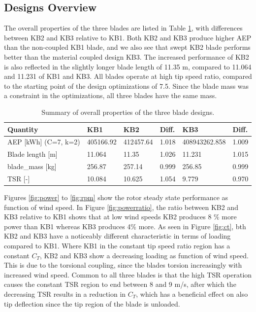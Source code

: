 \subsection{Designs Overview}

The overall properties of the three blades are listed in Table \ref{tab:overall_summary}, with differences between KB2 and KB3 relative to KB1.
Both KB2 and KB3 produce higher AEP than the non-coupled KB1 blade, and we also see that swept KB2 blade performs better than the material coupled design KB3.
The increased performance of KB2 is also reflected in the slightly longer blade length of 11.35 m, compared to 11.064 and 11.231 of KB1 and KB3.
All blades operate at high tip speed ratio, compared to the starting point of the design optimizations of 7.5.
Since the blade mass was a constraint in the optimizations, all three blades have the same mass.

\begin{table}
\begin{tabular}{l|l|ll|ll}
\hline
 Quantity     & KB1           & KB2           & Diff.          & KB3           & Diff.          \\
\hline
 AEP [kWh] (C=7, k=2)     & 405166.92 & 412457.64  & 1.018  & 408943262.858 & 1.009  \\
 Blade length [m] & 11.064 & 11.35  & 1.026  & 11.231  & 1.015  \\
 blade\_mass [kg]  & 256.87 & 257.14 & 0.999 & 256.85  & 0.999 \\
 TSR [-]          & 10.084 & 10.625  & 1.054   & 9.779 & 0.970 \\
\hline
\hline
\end{tabular}
\caption{Summary of overall properties of the three blade designs.}
\label{tab:overall_summary}
\end{table}

Figures \ref{fig:power} to \ref{fig:rpm} show the rotor steady state performance as function of wind speed.
In Figure \ref{fig:powerratio}, the ratio between KB2 and KB3 relative to KB1 shows that at low wind speeds KB2 produces 8 \% more power than KB1 whereas KB3 produces 4\% more.
As seen in Figure \ref{fig:ct}, bth KB2 and KB3 have a noticeably different characteristic in terms of loading compared to KB1.
Where KB1 in the constant tip speed ratio region has a constant $C_T$, KB2 and KB3 show a decreasing loading as function of wind speed.
This is due to the torsional coupling, since the blades torsion increasingly with increased wind speed.
Common to all three blades is that the high TSR operation causes the constant TSR region to end between 8 and 9 m/s, after which the decreasing TSR results in a reduction in $C_T$, which has a beneficial effect on also tip deflection since the tip region of the blade is unloaded.


